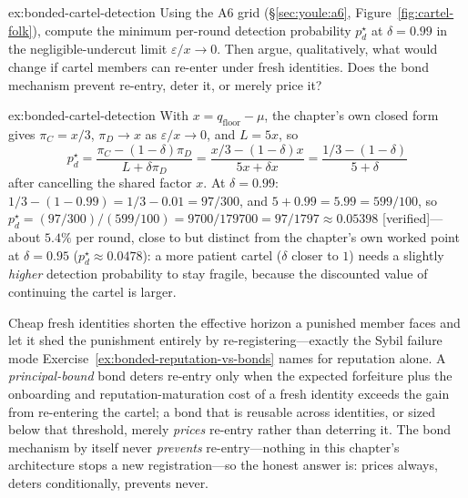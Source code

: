 \documentclass[11pt,a4paper]{article}
\theoremstyle{definition}
\theoremstyle{remark}
\begin{document}
\begin{pdexercise}[kind=Trace,rating=2]{ex:bonded-cartel-detection}
Using the A6 grid (\S\ref{sec:youle:a6}, Figure~\ref{fig:cartel-folk}), compute the minimum per-round detection probability $p_d^\star$ at $\delta = 0.99$ in the negligible-undercut limit $\varepsilon/x \to 0$. Then argue, qualitatively, what would change if cartel members can re-enter under fresh identities. Does the bond mechanism prevent re-entry, deter it, or merely price it?
\end{pdexercise}
\begin{pdsolution}{ex:bonded-cartel-detection}
With $x = q_{\mathrm{floor}} - \mu$, the chapter's own closed form gives $\pi_C = x/3$, $\pi_D \to x$ as $\varepsilon/x\to0$, and $L=5x$, so
\[
p_d^\star=\frac{\pi_C-(1-\delta)\pi_D}{L+\delta\pi_D} = \frac{x/3-(1-\delta)x}{5x+\delta x} = \frac{1/3-(1-\delta)}{5+\delta}
\]
after cancelling the shared factor $x$. At $\delta=0.99$: $1/3-(1-0.99)=1/3-0.01=97/300$, and $5+0.99=5.99=599/100$, so $p_d^\star = (97/300)/(599/100) = 9700/179700 = 97/1797 \approx 0.05398$ [verified]---about $5.4\%$ per round, close to but distinct from the chapter's own worked point at $\delta=0.95$ ($p_d^\star\approx0.0478$): a more patient cartel ($\delta$ closer to $1$) needs a slightly \emph{higher} detection probability to stay fragile, because the discounted value of continuing the cartel is larger.

Cheap fresh identities shorten the effective horizon a punished member faces and let it shed the punishment entirely by re-registering---exactly the Sybil failure mode Exercise~\ref{ex:bonded-reputation-vs-bonds} names for reputation alone. A \emph{principal-bound} bond deters re-entry only when the expected forfeiture plus the onboarding and reputation-maturation cost of a fresh identity exceeds the gain from re-entering the cartel; a bond that is reusable across identities, or sized below that threshold, merely \emph{prices} re-entry rather than deterring it. The bond mechanism by itself never \emph{prevents} re-entry---nothing in this chapter's architecture stops a new registration---so the honest answer is: prices always, deters conditionally, prevents never.
\end{pdsolution}
\end{document}

